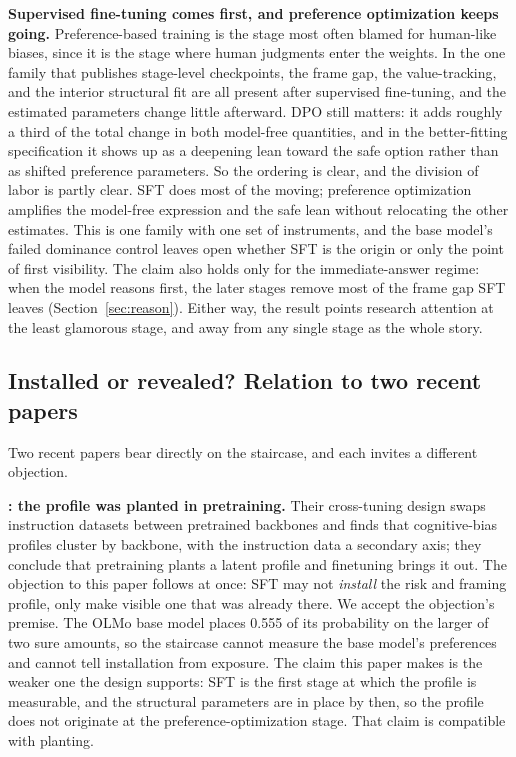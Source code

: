\documentclass[11pt]{article}
\begin{document}
\textbf{Supervised fine-tuning comes first, and preference optimization keeps going.} Preference-based
training is the stage most often blamed for human-like biases, since it is the stage where human
judgments enter the weights. In the one family that publishes stage-level checkpoints, the frame gap,
the value-tracking, and the interior structural fit are all present after supervised fine-tuning, and
the estimated parameters change little afterward. DPO still matters: it adds roughly a third of the total
change in both model-free quantities, and in the better-fitting specification it shows up as a deepening
lean toward the safe option rather than as shifted preference parameters. So the ordering is clear, and
the division of labor is partly clear. SFT does most of the moving; preference optimization amplifies the
model-free expression and the safe lean without relocating the other estimates. This is one family with one set of instruments, and the base model's failed dominance
control leaves open whether SFT is the origin or only the point of first visibility. The claim also
holds only for the immediate-answer regime: when the model reasons first, the later stages remove most of
the frame gap SFT leaves (Section~\ref{sec:reason}). Either way, the result points research attention at
the least glamorous stage, and away from any single stage as the whole story.

\subsection{Installed or revealed? Relation to two recent papers}\label{sec:rivals}

Two recent papers bear directly on the staircase, and each invites a different objection.

\textbf{\citet{itzhak2025}: the profile was planted in pretraining.} Their cross-tuning design swaps
instruction datasets between pretrained backbones and finds that cognitive-bias profiles cluster by
backbone, with the instruction data a secondary axis; they conclude that pretraining plants a latent
profile and finetuning brings it out. The objection to this paper follows at once: SFT may not
\emph{install} the risk and framing profile, only make visible one that was already there. We accept
the objection's premise. The OLMo base model places 0.555 of its probability on the larger of two sure
amounts, so the staircase cannot measure the base model's preferences and cannot tell installation
from exposure. The claim this paper makes is the weaker one the design supports: SFT is the first stage
at which the profile is measurable, and the structural parameters are in place by then, so the profile
does not originate at the preference-optimization stage. That claim is compatible with planting.
\end{document}
